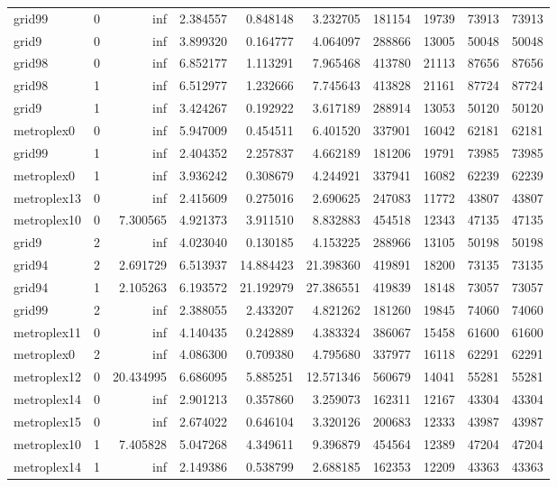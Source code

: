 \begin{longtable}{|l|r|r|r|r|r|r|r|r|r|}
grid99 & 0 & inf & 2.384557 & 0.848148 & 3.232705 & 181154 & 19739 & 73913 & 73913 \\
grid9 & 0 & inf & 3.899320 & 0.164777 & 4.064097 & 288866 & 13005 & 50048 & 50048 \\
grid98 & 0 & inf & 6.852177 & 1.113291 & 7.965468 & 413780 & 21113 & 87656 & 87656 \\
grid98 & 1 & inf & 6.512977 & 1.232666 & 7.745643 & 413828 & 21161 & 87724 & 87724 \\
grid9 & 1 & inf & 3.424267 & 0.192922 & 3.617189 & 288914 & 13053 & 50120 & 50120 \\
metroplex0 & 0 & inf & 5.947009 & 0.454511 & 6.401520 & 337901 & 16042 & 62181 & 62181 \\
grid99 & 1 & inf & 2.404352 & 2.257837 & 4.662189 & 181206 & 19791 & 73985 & 73985 \\
metroplex0 & 1 & inf & 3.936242 & 0.308679 & 4.244921 & 337941 & 16082 & 62239 & 62239 \\
metroplex13 & 0 & inf & 2.415609 & 0.275016 & 2.690625 & 247083 & 11772 & 43807 & 43807 \\
metroplex10 & 0 & 7.300565 & 4.921373 & 3.911510 & 8.832883 & 454518 & 12343 & 47135 & 47135 \\
grid9 & 2 & inf & 4.023040 & 0.130185 & 4.153225 & 288966 & 13105 & 50198 & 50198 \\
grid94 & 2 & 2.691729 & 6.513937 & 14.884423 & 21.398360 & 419891 & 18200 & 73135 & 73135 \\
grid94 & 1 & 2.105263 & 6.193572 & 21.192979 & 27.386551 & 419839 & 18148 & 73057 & 73057 \\
grid99 & 2 & inf & 2.388055 & 2.433207 & 4.821262 & 181260 & 19845 & 74060 & 74060 \\
metroplex11 & 0 & inf & 4.140435 & 0.242889 & 4.383324 & 386067 & 15458 & 61600 & 61600 \\
metroplex0 & 2 & inf & 4.086300 & 0.709380 & 4.795680 & 337977 & 16118 & 62291 & 62291 \\
metroplex12 & 0 & 20.434995 & 6.686095 & 5.885251 & 12.571346 & 560679 & 14041 & 55281 & 55281 \\
metroplex14 & 0 & inf & 2.901213 & 0.357860 & 3.259073 & 162311 & 12167 & 43304 & 43304 \\
metroplex15 & 0 & inf & 2.674022 & 0.646104 & 3.320126 & 200683 & 12333 & 43987 & 43987 \\
metroplex10 & 1 & 7.405828 & 5.047268 & 4.349611 & 9.396879 & 454564 & 12389 & 47204 & 47204 \\
metroplex14 & 1 & inf & 2.149386 & 0.538799 & 2.688185 & 162353 & 12209 & 43363 & 43363 \\

\end{longtable}

